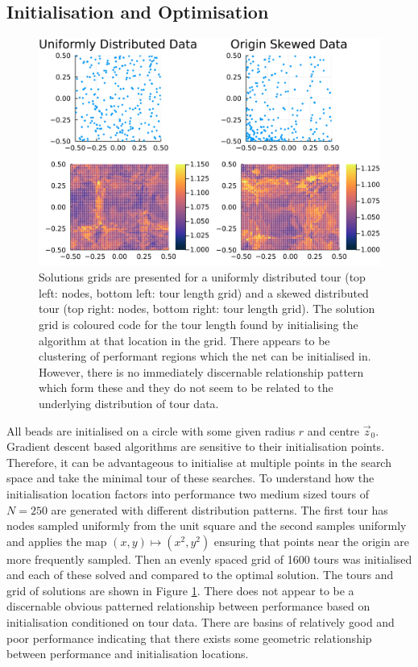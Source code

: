 \subsection{Initialisation and Optimisation} \label{section:initialisation}
\begin{figure}[h]
	\centering
	\includegraphics[width=\textwidth]{images/elastic_neighbourhood/fig_initialisation_clusters_50}
	\def\c{Solutions grids are presented for a uniformly distributed tour and a skewed distributed tour. }
	\caption[\c]{\label{fig:initialisationgrid} Solutions grids are presented for a uniformly distributed tour (top left: nodes, bottom left: tour length grid) and a skewed distributed tour (top right: nodes, bottom right: tour length grid). The solution grid is coloured code for the tour length found by initialising the algorithm at that location in the grid. There appears to be clustering of performant regions which the net can be initialised in. However, there is no immediately discernable relationship pattern which form these and they do not seem to be related to the underlying distribution of tour data.}
\end{figure}
\FloatBarrier
All beads are initialised on a circle with some given radius $r$ and centre $\vec{z}_0$. Gradient descent based algorithms are sensitive to their initialisation points. Therefore, it can be advantageous to initialise at multiple points in the search space and take the minimal tour of these searches. To understand how the initialisation location factors into performance two medium sized tours of $N=250$ are generated with different distribution patterns. The first tour has nodes sampled uniformly from the unit square and the second samples uniformly and applies the map $(x, y) \mapsto (x^2, y^2)$ ensuring that points near the origin are more frequently sampled. Then an evenly spaced grid of 1600 tours was initialised and each of these solved and compared to the optimal solution. The tours and grid of solutions are shown in Figure \ref{fig:initialisationgrid}. There does not appear to be a discernable obvious patterned relationship between performance based on initialisation conditioned on tour data. There are basins of relatively good and poor performance indicating that there exists some geometric relationship between performance and initialisation locations.
